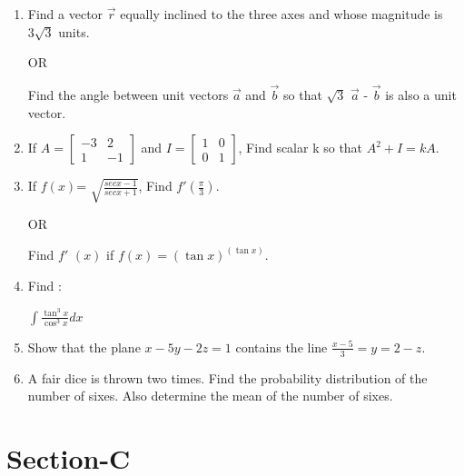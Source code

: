 \documentclass[journal,12pt,twocolumn]{IEEEtran}
\renewcommand\thesection{\arabic{section}}
\begin{document}
\renewcommand{\theequation}{\theenumi}
\begin{enumerate}[label=\thesection.\arabic*.,ref=\thesection.\theenumi]
\item  Find a vector $\overrightarrow{r}$ equally inclined to the three axes and whose magnitude is $3\sqrt{3}$ units.
 
    \begin{center}
        OR
    \end{center}
    
    Find the angle between unit vectors $\overrightarrow{a}$ and $\overrightarrow{b}$ so that $\sqrt{3}$ $\overrightarrow{a}$ - $\overrightarrow{b}$ is also a unit vector.\\
    
\item If $A=\begin{bmatrix}-3 & 2 \\ 1 & -1 \end{bmatrix} $ and $ I=\begin{bmatrix}1 & 0 \\ 0 & 1 \end{bmatrix}$, Find scalar k so that $A^2 + I = kA$.\\

        \item If $f\left(x\right)$= $\sqrt{\frac{sec x-1}{sec x+1}}$, Find $ f'\left(\frac{\pi}{3}\right).$
\begin{center}
        OR
    \end{center}
Find $f'$ $\left(x\right)$ if $f\left(x\right)=\left(\tan x\right)^{\left(\tan x\right)}$.\\

\item Find : \begin{center} $\int \frac{\tan^3x}{\cos^3x} dx $ \end{center} 

\item Show that the plane $x-5y-2z=1$ contains the line $\frac{x-5}{3}=y=2-z$.\\

\item A fair dice is thrown two times. Find the probability distribution of the number of sixes. Also determine the mean of the number of sixes.\\
\end{enumerate}
\section{Section-C}
\end{document}
